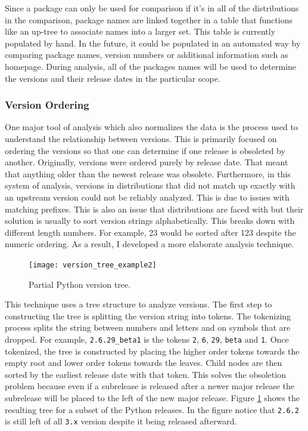 \documentclass[letterpaper,10pt]{article}
\begin{document}
Since a package can only be used for comparison if it's in all of the distributions in the comparison, package names are linked together in a table that functions like an up-tree to associate names into a larger set.  This table is currently populated by hand.  In the future, it could be populated in an automated way by comparing package names, version numbers or additional information such as homepage.  During analysis, all of the packages names will be used to determine the versions and their release dates in the particular scope.
\subsubsection{Version Ordering}
One major tool of analysis which also normalizes the data is the process used to understand the relationship between versions.  This is primarily focused on ordering the versions so that one can determine if one release is obsoleted by another.  Originally, versions were ordered purely by release date.  That meant that anything older than the newest release was obsolete.  Furthermore, in this system of analysis, versions in distributions that did not match up exactly with an upstream version could not be reliably analyzed.  This is due to issues with matching prefixes.  This is also an issue that distributions are faced with but their solution is usually to sort version strings alphabetically.  This breaks down with different length numbers.  For example, 23 would be sorted after 123 despite the numeric ordering.  As a result, I developed a more elaborate analysis technique.

\begin{figure}[htbp]
\texttt{[image: version\_tree\_example2]}
\caption{Partial Python version tree.}
\label{fig:vt}
\end{figure}

This technique uses a tree structure to analyze versions.  The first step to constructing the tree is splitting the version string into tokens.  The tokenizing process splits the string between numbers and letters and on symbols that are dropped.  For example, \texttt{2.6.29\_beta1} is the tokens \texttt{2}, \texttt{6}, \texttt{29}, \texttt{beta} and \texttt{1}.  Once tokenized, the tree is constructed by placing the higher order tokens towards the empty root and lower order tokens towards the leaves.  Child nodes are then sorted by the earliest release date with that token.  This solves the obsoletion problem because even if a subrelease is released after a newer major release the subrelease will be placed to the left of the new major release.  Figure \ref{fig:vt} shows the resulting tree for a subset of the Python releases.  In the figure notice that \texttt{2.6.2} is still left of all \texttt{3.x} version despite it being released afterward.
\end{document}
